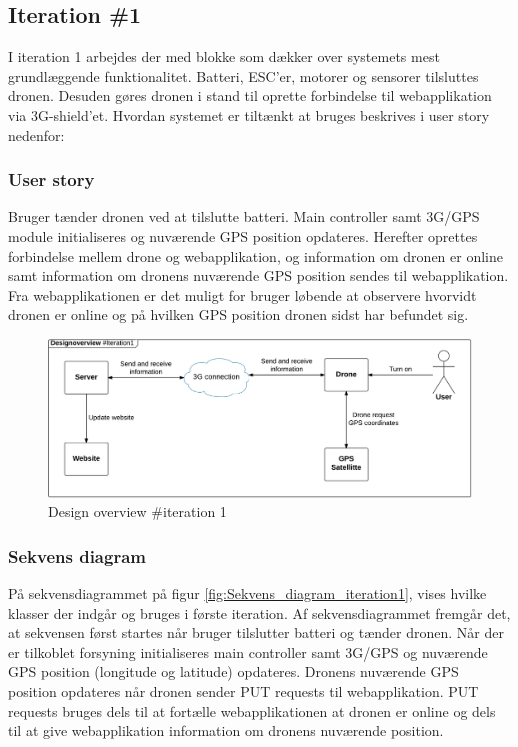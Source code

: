 \subsection{Iteration \#1}
I iteration 1 arbejdes der med blokke som dækker over systemets mest grundlæggende funktionalitet. Batteri,
ESC’er, motorer og sensorer tilsluttes dronen. Desuden gøres dronen i stand til oprette forbindelse til webapplikation via 3G-shield’et. Hvordan systemet er tiltænkt at bruges beskrives i user story nedenfor:

\subsubsection*{User story}
Bruger tænder dronen ved at tilslutte batteri. Main controller samt 3G/GPS module initialiseres og nuværende GPS position opdateres. Herefter oprettes forbindelse mellem drone og webapplikation, og information om dronen er online samt information om dronens nuværende GPS position sendes til webapplikation. Fra webapplikationen er det muligt for bruger løbende at observere hvorvidt dronen er online og på hvilken GPS position dronen sidst har befundet sig.

\begin{figure}[H]
	\centering
	\includegraphics[width=1\textwidth]{Billeder/design_overview/design_overview_iteration1.png}
	\vspace{-.5cm}
	\caption{Design overview \#iteration 1}
	\label{fig:design_overview_UC1}
\end{figure}


\newpage
\subsubsection*{Sekvens diagram}
På sekvensdiagrammet på figur \ref{fig:Sekvens_diagram_iteration1}, vises hvilke klasser der indgår og bruges i første iteration. Af sekvensdiagrammet fremgår det, at sekvensen først startes når bruger tilslutter batteri og tænder dronen. Når der er tilkoblet forsyning initialiseres main controller samt 3G/GPS og nuværende GPS position  (longitude og latitude) opdateres. Dronens nuværende GPS position opdateres når dronen sender PUT requests til webapplikation. PUT requests bruges dels til at fortælle webapplikationen at dronen er online og dels til at give webapplikation information om dronens nuværende position. 


